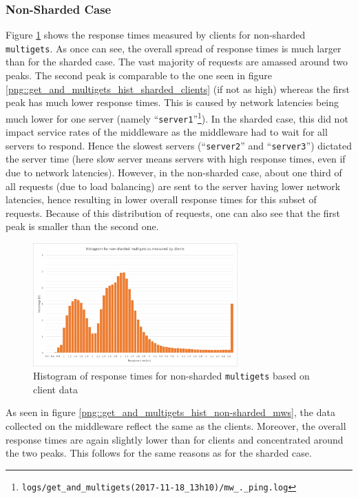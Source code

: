 \documentclass[11pt,a4paper]{article}
\begin{document}
\subsubsection{Non-Sharded Case}
Figure \ref{png::get_and_multigets_hist_non-sharded_clients} shows the response times measured by clients for non-sharded \texttt{multigets}. As once can see, the overall spread of response times is much larger than for the sharded case. The vast majority of requests are amassed around two peaks. The second peak is comparable to the one seen in figure \ref{png::get_and_multigets_hist_sharded_clients} (if not as high) whereas the first peak has much lower response times. This is caused by network latencies being much lower for one server (namely ``\texttt{server1}''\footnote{\texttt{logs/get_and_multigets(2017-11-18_13h10)/mw_._ping.log}}). In the sharded case, this did not impact service rates of the middleware as the middleware had to wait for all servers to respond. Hence the slowest servers (``\texttt{server2}'' and ``\texttt{server3}'') dictated the server time (here slow server means servers with high response times, even if due to network latencies). However, in the non-sharded case, about one third of all requests (due to load balancing) are sent to the server having lower network latencies, hence resulting in lower overall response times for this subset of requests. Because of this distribution of requests, one can also see that the first peak is smaller than the second one.

\begin{figure}[!h]
    \centering
    \includegraphics[width=0.7\textwidth]{processing/graphics/get_and_multigets_hist_non-sharded_clients.png}
    \caption{Histogram of response times for non-sharded \texttt{multigets} based on client data}
    \label{png::get_and_multigets_hist_non-sharded_clients}
\end{figure}

As seen in figure \ref{png::get_and_multigets_hist_non-sharded_mws}, the data collected on the middleware reflect the same as the clients. Moreover, the overall response times are again slightly lower than for clients and concentrated around the two peaks. This follows for the same reasons as for the sharded case.
\end{document}
